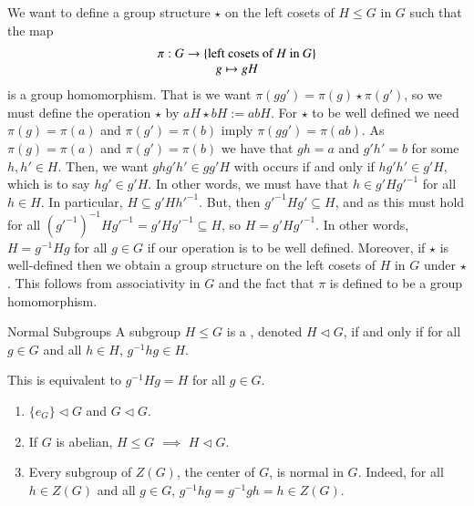 \documentclass[12pt, a4paper, twoside, openright, titlepage]{book}
\begin{document}
\begin{cons}{}{}
        We want to define a group structure $\star$ on the left cosets of $H \leq G$ in $G$ such that the map \begin{equation}
                \begin{array}{c} \pi:G\rightarrow \{\text{left cosets of $H$ in $G$}\} \\ g\mapsto gH \end{array}
        \end{equation}
        is a group homomorphism. That is we want $\pi(gg') = \pi(g) \star \pi(g')$, so we must define the operation $\star$ by $aH\star bH := abH$. For $\star$ to be well defined we need $\pi(g) = \pi(a)$ and $\pi(g') = \pi(b)$ imply $\pi(gg') = \pi(ab)$. As $\pi(g) = \pi(a)$ and $\pi(g') = \pi(b)$ we have that $gh = a$ and $g'h' = b$ for some $h,h' \in H$. Then, we want $ghg'h' \in gg'H$ with occurs if and only if $hg'h' \in g'H$, which is to say $hg' \in g'H$. In other words, we must have that $h \in g'H{g'}^{-1}$ for all $h \in H$. In particular, $H \subseteq g'H{h'}^{-1}$. But, then ${g'}^{-1}Hg' \subseteq H$, and as this must hold for all $({g'}^{-1})^{-1}H{g'}^{-1} = g'H{g'}^{-1} \subseteq H$, so $H = g'H{g'}^{-1}$. In other words, $H = g^{-1}Hg$ for all $g \in G$ if our operation is to be well defined. Moreover, if $\star$ is well-defined then we obtain a group structure on the left cosets of $H$ in $G$ under $\star$. This follows from associativity in $G$ and the fact that $\pi$ is defined to be a group homomorphism.
\end{cons}

\begin{defn}{Normal Subgroups}{}
        A subgroup $H \leq G$ is a , denoted $H \vartriangleleft G$, if and only if for all $g \in G$ and all $h \in H$, $g^{-1}hg \in H$.
\end{defn}

\begin{note*}{}{}
        This is equivalent to $g^{-1}Hg = H$ for all $g \in G$.
\end{note*}

\begin{eg}{}{}
        \leavevmode
        \begin{enumerate}
                \item $\{e_G\}\vartriangleleft G$ and $G \vartriangleleft G$.
                \item If $G$ is abelian, $H \leq G$ $\implies$ $H \vartriangleleft G$.
                \item Every subgroup of $Z(G)$, the center of $G$, is normal in $G$. Indeed, for all $h \in Z(G)$ and all $g \in G$, $g^{-1}hg = g^{-1}gh = h \in Z(G)$.
        \end{enumerate}
\end{eg}
\end{document}
